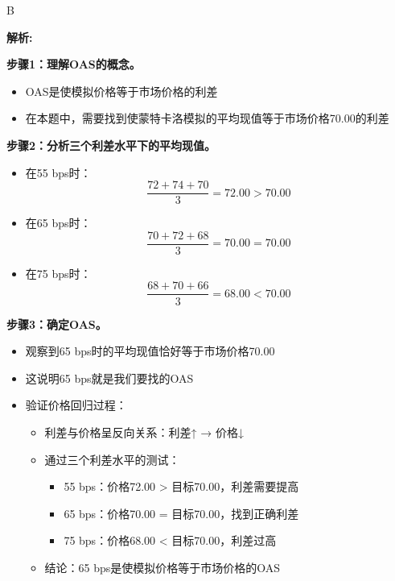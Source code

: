 \documentclass{article}
\newenvironment{explanation}
{\textbf{解析:}\par}
{\par}
\begin{document}
    
    
    \begin{correctanswer}
    B
    \end{correctanswer}
    
 \begin{explanation}
    \textbf{步骤1：理解OAS的概念。}
    \begin{itemize}
        \item OAS是使模拟价格等于市场价格的利差
        \item 在本题中，需要找到使蒙特卡洛模拟的平均现值等于市场价格70.00的利差
    \end{itemize}

    \textbf{步骤2：分析三个利差水平下的平均现值。}
    \begin{itemize}
        \item 在55 bps时：\[\frac{72 + 74 + 70}{3} = 72.00 > 70.00\]
        \item 在65 bps时：\[\frac{70 + 72 + 68}{3} = 70.00 = 70.00\]
        \item 在75 bps时：\[\frac{68 + 70 + 66}{3} = 68.00 < 70.00\]
    \end{itemize}

        \textbf{步骤3：确定OAS。}
    \begin{itemize}
        \item 观察到65 bps时的平均现值恰好等于市场价格70.00
        \item 这说明65 bps就是我们要找的OAS
               \item 验证价格回归过程：
            \begin{itemize}
                \item 利差与价格呈反向关系：利差↑ → 价格↓
                \item 通过三个利差水平的测试：
                    \begin{itemize}
                        \item 55 bps：价格72.00 > 目标70.00，利差需要提高
                        \item 65 bps：价格70.00 = 目标70.00，找到正确利差
                        \item 75 bps：价格68.00 < 目标70.00，利差过高
                    \end{itemize}
                \item 结论：65 bps是使模拟价格等于市场价格的OAS
            \end{itemize}
    \end{itemize}
\end{explanation}
    
\end{document}
